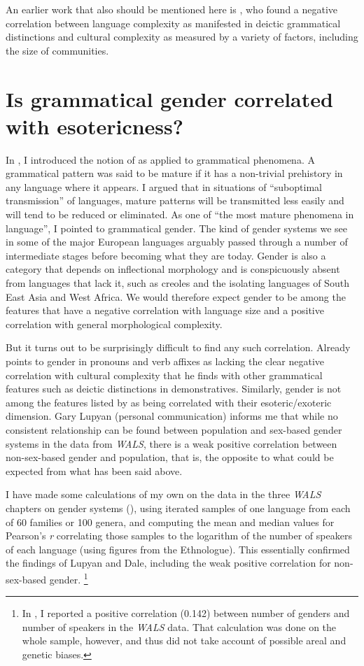 \documentclass[output=collectionpaper]{langsci/langscibook}
\begin{document}
An earlier work that also should be mentioned here is \citet{Perkins1992}, who found a negative correlation between language complexity as manifested in deictic grammatical distinctions and cultural complexity as measured by a variety of factors, including the size of communities.

\section{Is grammatical gender correlated with esotericness?}

In \citet{Dahl2004}, I introduced the notion of  as applied to grammatical phenomena. A grammatical pattern was said to be mature if it has a non-trivial prehistory in any language where it appears. I argued that in situations of ``suboptimal transmission'' of languages, mature patterns will be transmitted less easily and will tend to be reduced or eliminated.  As one of ``the most mature phenomena in language'', I pointed to grammatical gender. The kind of gender systems we see in some of the major European languages arguably passed through a number of intermediate stages before becoming what they are today. Gender is also a category that depends on inflectional morphology and is conspicuously absent from languages that lack it, such as creoles and the isolating languages of South East Asia and West Africa. We would therefore expect gender to be among the features that have a negative correlation with language size and a positive correlation with general morphological complexity.

But it turns out to be surprisingly difficult to find any such correlation. Already \citet[157]{Perkins1992} points to gender in pronouns and verb affixes as lacking the clear negative correlation with cultural complexity that he finds with other grammatical features such as deictic distinctions in demonstratives. Similarly, gender is not among the features listed by \citet{Lupyan2010} as being correlated with their esoteric/exoteric dimension. Gary Lupyan (personal communication) informs me that while no consistent relationship can be found between population and sex-based gender systems in the data from \textit{WALS}, there is a weak positive correlation between non-sex-based gender and population, that is, the opposite to what could be expected from what has been said above.

I have made some calculations of my own on the data in the three \textit{WALS} chapters on gender systems (\citealt{Corbett2013,Corbett2013a,Corbett2013b}), using iterated samples of one language from each of 60 families or 100 genera, and computing the mean and median values for Pearson’s \textit{r} correlating those samples to the logarithm of the number of speakers of each language (using figures from the Ethnologue). This essentially confirmed the findings of Lupyan and Dale, including the weak positive correlation for non-sex-based gender.%
\footnote{In \citet{Dahl2011}, I reported a positive correlation (0.142) between number of genders and number of speakers in the \textit{WALS} data. That calculation was done on the whole sample, however, and thus did not take account of possible areal and genetic biases.}
\end{document}
